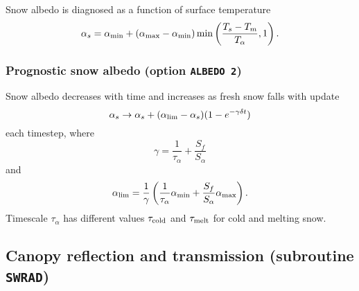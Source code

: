 \documentclass[fleqn]{article}
\begin{document}
Snow albedo is diagnosed as a function of surface temperature 
\begin{equation}
\alpha_s = \alpha_{\rm min} + (\alpha_{\rm max} - \alpha_{\rm min})
           \min\left(\frac{T_s - T_m}{T_\alpha}, 1\right).        
\end{equation}

\subsubsection{Prognostic snow albedo (option {\tt ALBEDO 2})}

Snow albedo decreases with time and increases as fresh snow falls with update
\begin{equation}
\alpha_s \rightarrow \alpha_s + (\alpha_{\rm lim} - \alpha_s)(1-e^{-\gamma\delta t}) 
\end{equation}
each timestep, where
\begin{equation}
\gamma = \frac{1}{\tau_\alpha}+\frac{S_f}{S_\alpha}
\end{equation}
and
\begin{equation}
\alpha_{\rm lim} = \frac{1}{\gamma}\left(\frac{1}{\tau_\alpha}\alpha_{\rm min} +\frac{S_f}{S_\alpha}\alpha_{\rm max}\right).
\end{equation}
Timescale $\tau_\alpha$ has different values $\tau_{\rm cold}$ and $\tau_{\rm melt}$ for cold and melting snow.

\subsection{Canopy reflection and transmission (subroutine {\tt SWRAD})}
\end{document}
